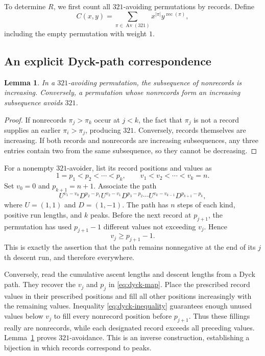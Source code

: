 \documentclass[11pt,a4paper]{article}
\newtheorem{lemma}[theorem]{Lemma}
\theoremstyle{definition}
\theoremstyle{remark}
\newcommand{\Av}{\operatorname{Av}}
\newcommand{\rec}{\operatorname{rec}}
\begin{document}
To determine $R$, we first count all $321$-avoiding permutations by records.
Define
\[
 C(x,y)=\sum_{\pi\in\Av(321)}x^{|\pi|}y^{\rec(\pi)},
\]
including the empty permutation with weight $1$.

\subsection{An explicit Dyck-path correspondence}

\begin{lemma}\label{lem:nonrecords}
In a $321$-avoiding permutation, the subsequence of nonrecords is increasing.
Conversely, a permutation whose nonrecords form an increasing subsequence
avoids $321$.
\end{lemma}
\begin{proof}
If nonrecords $\pi_j>\pi_k$ occur at $j<k$, the fact that $\pi_j$ is not a
record supplies an earlier $\pi_i>\pi_j$, producing $321$. Conversely,
records themselves are increasing. If both records and nonrecords are
increasing subsequences, any three entries contain two from the same
subsequence, so they cannot be decreasing.
\end{proof}

For a nonempty $321$-avoider, list its record positions and values as
\[
 1=p_1<p_2<\cdots<p_k,\qquad
 v_1<v_2<\cdots<v_k=n.
\]
Set $v_0=0$ and $p_{k+1}=n+1$. Associate the path
\begin{equation}\label{eq:dyck-map}
 U^{v_1-v_0}D^{p_2-p_1}
 U^{v_2-v_1}D^{p_3-p_2}\cdots
 U^{v_k-v_{k-1}}D^{p_{k+1}-p_k},
\end{equation}
where $U=(1,1)$ and $D=(1,-1)$.
The path has $n$ steps of each kind, positive run lengths, and $k$ peaks.
Before the next record at $p_{j+1}$, the permutation has used
$p_{j+1}-1$ different values not exceeding $v_j$. Hence
\begin{equation}\label{eq:dyck-inequality}
 v_j\geq p_{j+1}-1.
\end{equation}
This is exactly the assertion that the path remains nonnegative at the end
of its $j$th descent run, and therefore everywhere.

Conversely, read the cumulative ascent lengths and descent lengths from a
Dyck path. They recover the $v_j$ and $p_j$ in \eqref{eq:dyck-map}.
Place the prescribed record values in their prescribed positions and fill
all other positions increasingly with the remaining values. Inequality
\eqref{eq:dyck-inequality} guarantees enough unused values below $v_j$ to
fill every nonrecord position before $p_{j+1}$. Thus these fillings really
are nonrecords, while each designated record exceeds all preceding values.
Lemma~\ref{lem:nonrecords} proves $321$-avoidance. This is an inverse
construction, establishing a bijection in which records correspond to peaks.
\end{document}
